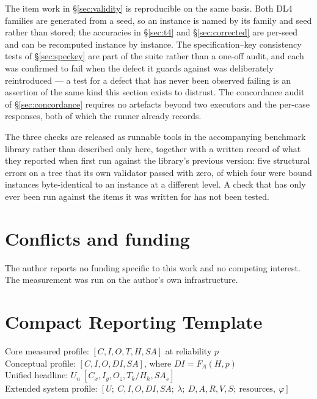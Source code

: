 \documentclass[11pt]{article}
\theoremstyle{definition}
\newcommand{\FA}{\ensuremath{F_A(H,p)}}
\begin{document}
The item work in \S\ref{sec:validity} is reproducible on the same basis. Both DL4 families are generated from a seed, so an instance is named by its family and seed rather than stored; the accuracies in \S\ref{sec:t4} and \S\ref{sec:corrected} are per-seed and can be recomputed instance by instance. The specification--key consistency tests of \S\ref{sec:speckey} are part of the suite rather than a one-off audit, and each was confirmed to fail when the defect it guards against was deliberately reintroduced --- a test for a defect that has never been observed failing is an assertion of the same kind this section exists to distrust. The concordance audit of \S\ref{sec:concordance} requires no artefacts beyond two executors and the per-case responses, both of which the runner already records.

The three checks are released as runnable tools in the accompanying benchmark library rather than described only here, together with a written record of what they reported when first run against the library's previous version: five structural errors on a tree that its own validator passed with zero, of which four were bound instances byte-identical to an instance at a different level. A check that has only ever been run against the items it was written for has not been tested.

\section*{Conflicts and funding}

The author reports no funding specific to this work and no competing interest. The measurement was run on the author's own infrastructure.




\appendix

\section{Compact Reporting Template}

\begin{center}
Core measured profile: $[C, I, O, T, H, SA]$ at reliability $p$\\
Conceptual profile: $[C, I, O, DI, SA]$, where $DI = \FA{}$\\
Unified headline: $U_n\ [C_x, I_y, O_z, T_k/H_h, SA_s]$\\
Extended system profile: $[U;\ C,I,O,DI,SA;\ \lambda;\ D,A,R,V,S;\ \text{resources},\ \varphi]$
\end{center}
\end{document}
